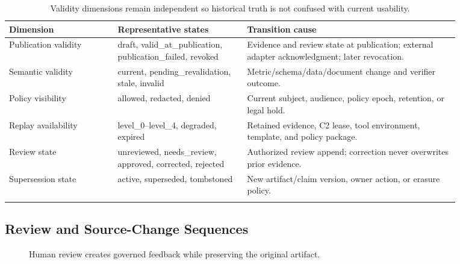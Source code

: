 \documentclass[10pt]{article}
\begin{document}
\begin{longtable}{L{0.21\linewidth}L{0.25\linewidth}L{0.41\linewidth}}
\toprule
\textbf{Dimension} & \textbf{Representative states} & \textbf{Transition cause} \\
\midrule
\endhead
Publication validity & draft, valid\_at\_publication, publication\_failed, revoked & Evidence and review state at publication; external adapter acknowledgment; later revocation. \\
Semantic validity & current, pending\_revalidation, stale, invalid & Metric/schema/data/document change and verifier outcome. \\
Policy visibility & allowed, redacted, denied & Current subject, audience, policy epoch, retention, or legal hold. \\
Replay availability & level\_0--level\_4, degraded, expired & Retained evidence, C2 lease, tool environment, template, and policy package. \\
Review state & unreviewed, needs\_review, approved, corrected, rejected & Authorized review append; correction never overwrites prior evidence. \\
Supersession state & active, superseded, tombstoned & New artifact/claim version, owner action, or erasure policy. \\
\bottomrule
\caption{Validity dimensions remain independent so historical truth is not confused with current usability.}
\end{longtable}

\clearpage
\subsection{Review and Source-Change Sequences}

\begin{figure}[H]
\centering
{}
\caption{Human review creates governed feedback while preserving the original artifact.}
\end{figure}
\end{document}
